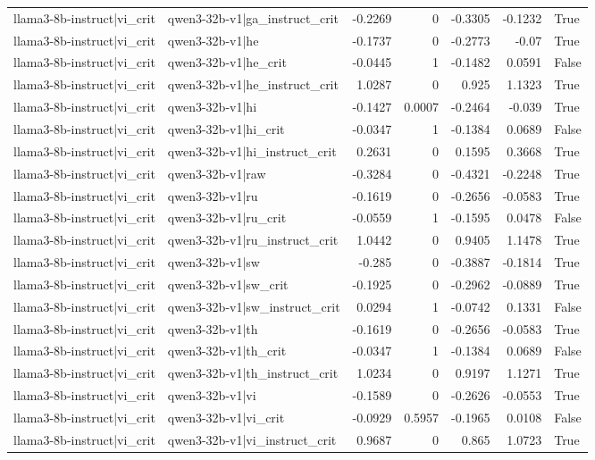 \begin{table}
\begin{tabular}{l l r r r r l}
llama3-8b-instruct|vi_crit & qwen3-32b-v1|ga_instruct_crit & -0.2269 & 0 & -0.3305 & -0.1232 & True \\
llama3-8b-instruct|vi_crit & qwen3-32b-v1|he & -0.1737 & 0 & -0.2773 & -0.07 & True \\
llama3-8b-instruct|vi_crit & qwen3-32b-v1|he_crit & -0.0445 & 1 & -0.1482 & 0.0591 & False \\
llama3-8b-instruct|vi_crit & qwen3-32b-v1|he_instruct_crit & 1.0287 & 0 & 0.925 & 1.1323 & True \\
llama3-8b-instruct|vi_crit & qwen3-32b-v1|hi & -0.1427 & 0.0007 & -0.2464 & -0.039 & True \\
llama3-8b-instruct|vi_crit & qwen3-32b-v1|hi_crit & -0.0347 & 1 & -0.1384 & 0.0689 & False \\
llama3-8b-instruct|vi_crit & qwen3-32b-v1|hi_instruct_crit & 0.2631 & 0 & 0.1595 & 0.3668 & True \\
llama3-8b-instruct|vi_crit & qwen3-32b-v1|raw & -0.3284 & 0 & -0.4321 & -0.2248 & True \\
llama3-8b-instruct|vi_crit & qwen3-32b-v1|ru & -0.1619 & 0 & -0.2656 & -0.0583 & True \\
llama3-8b-instruct|vi_crit & qwen3-32b-v1|ru_crit & -0.0559 & 1 & -0.1595 & 0.0478 & False \\
llama3-8b-instruct|vi_crit & qwen3-32b-v1|ru_instruct_crit & 1.0442 & 0 & 0.9405 & 1.1478 & True \\
llama3-8b-instruct|vi_crit & qwen3-32b-v1|sw & -0.285 & 0 & -0.3887 & -0.1814 & True \\
llama3-8b-instruct|vi_crit & qwen3-32b-v1|sw_crit & -0.1925 & 0 & -0.2962 & -0.0889 & True \\
llama3-8b-instruct|vi_crit & qwen3-32b-v1|sw_instruct_crit & 0.0294 & 1 & -0.0742 & 0.1331 & False \\
llama3-8b-instruct|vi_crit & qwen3-32b-v1|th & -0.1619 & 0 & -0.2656 & -0.0583 & True \\
llama3-8b-instruct|vi_crit & qwen3-32b-v1|th_crit & -0.0347 & 1 & -0.1384 & 0.0689 & False \\
llama3-8b-instruct|vi_crit & qwen3-32b-v1|th_instruct_crit & 1.0234 & 0 & 0.9197 & 1.1271 & True \\
llama3-8b-instruct|vi_crit & qwen3-32b-v1|vi & -0.1589 & 0 & -0.2626 & -0.0553 & True \\
llama3-8b-instruct|vi_crit & qwen3-32b-v1|vi_crit & -0.0929 & 0.5957 & -0.1965 & 0.0108 & False \\
llama3-8b-instruct|vi_crit & qwen3-32b-v1|vi_instruct_crit & 0.9687 & 0 & 0.865 & 1.0723 & True \\

\end{tabular}
\end{table}
